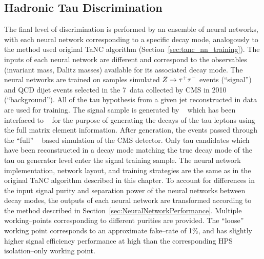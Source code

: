 \subsection{Hadronic Tau Discrimination}
%
The final level of discrimination is performed by an ensemble of neural
networks, with each neural network corresponding to a specific decay mode,
analogously to the method used original TaNC algorithm
(Section~\ref{sec:tanc_nn_training}).  The inputs of each neural network are
different and correspond to the observables (invariant mass, Dalitz masses)
available for its associated decay mode.  The neural networks are trained on
samples simulated $Z \to \tau^+\tau^-$ events (``signal'') and QCD dijet events
selected in the 7~\TeV data collected by CMS in 2010 (``background'').  All of
the tau hypothesis from a given jet reconstructed in data are used for training.
The \ZTT signal sample is generated by \PYTHIA~\cite{pythia6_4} which has been
interfaced to \TAUOLA~\cite{tauola} for the purpose of generating the decays of
the tau leptons using the full matrix element information.  After generation,
the events passed through the ``full'' \GEANT~\cite{geant} based simulation of
the CMS detector.  Only tau candidates which have been reconstructed in a decay
mode matching the true decay mode of the tau on generator level enter the signal
training sample.  The neural network implementation, network layout, and
training strategies are the same as in the original TaNC algorithm described in
this chapter.  To account for differences in the input signal purity and
separation power of the neural networks between decay modes, the outputs of each
neural network are transformed according to the method described in
Section~\ref{sec:NeuralNetworkPerformance}.  Multiple working--points
corresponding to different purities are provided.  The ``loose'' working point
corresponds to an approximate fake--rate of 1\%, and has slightly higher signal
efficiency performance at high \pt than the corresponding HPS isolation--only
working point.

